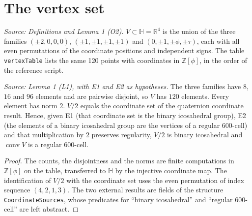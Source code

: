 \section{The vertex set}

\begin{definition}
  \label{def:vertex-set}
  \leanok
  \textit{Source: Definitions and Lemma 1 (O2).}
  \(V\subset\mathbb H=\mathbb R^4\) is the union of the three families
  \((\pm2,0,0,0)\), \((\pm1,\pm1,\pm1,\pm1)\) and
  \((0,\pm1,\pm\phi,\pm\tau)\), each with all even permutations of the
  coordinate positions and independent signs. The table
  \texttt{vertexTable} lists the same 120 points with coordinates in
  \(\mathbb Z[\phi]\), in the order of the reference script.
\end{definition}

\begin{lemma}
  \label{lem:coordinate-identification}
  \leanok
  \textit{Source: Lemma 1 (L1), with E1 and E2 as hypotheses.}
  The three families have \(8\), \(16\) and \(96\) elements and are
  pairwise disjoint, so \(V\) has \(120\) elements. Every element has norm
  \(2\). \(V/2\) equals the coordinate set of the quaternion coordinate
  result. Hence, given E1 (that coordinate set is the binary icosahedral
  group), E2 (the elements of a binary icosahedral group are the vertices of
  a regular 600-cell) and that multiplication by \(2\) preserves
  regularity, \(V/2\) is binary icosahedral and \(\operatorname{conv}V\) is
  a regular 600-cell.
\end{lemma}
\begin{proof}
  \leanok
  The counts, the disjointness and the norms are finite computations in
  \(\mathbb Z[\phi]\) on the table, transferred to \(\mathbb H\) by the
  injective coordinate map. The identification of \(V/2\) with the
  coordinate set uses the even permutation of index sequence
  \((4,2,1,3)\). The two external results are fields of the structure
  \texttt{CoordinateSources}, whose predicates for ``binary icosahedral''
  and ``regular 600-cell'' are left abstract.
\end{proof}


